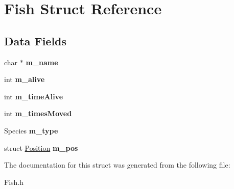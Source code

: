 \hypertarget{structFish}{\section{\-Fish \-Struct \-Reference}
\label{structFish}
}
\subsection*{\-Data \-Fields}
\begin{DoxyCompactItemize}
\item 
\hypertarget{structFish_a227fc9c6e076c3a45c48529133c4449b}{char $\ast$ {\bfseries m\-\_\-name}}\label{structFish_a227fc9c6e076c3a45c48529133c4449b}

\item 
\hypertarget{structFish_a9b5f5cc3303bdebc23cd2a22be494b9b}{int {\bfseries m\-\_\-alive}}\label{structFish_a9b5f5cc3303bdebc23cd2a22be494b9b}

\item 
\hypertarget{structFish_a3581ebfb141a0b221655da596359917c}{int {\bfseries m\-\_\-time\-Alive}}\label{structFish_a3581ebfb141a0b221655da596359917c}

\item 
\hypertarget{structFish_a8e361a8153eec3d33df2c6d3d556ee91}{int {\bfseries m\-\_\-times\-Moved}}\label{structFish_a8e361a8153eec3d33df2c6d3d556ee91}

\item 
\hypertarget{structFish_aa1bf10688c35a647e76457fbc0b01eab}{\-Species {\bfseries m\-\_\-type}}\label{structFish_aa1bf10688c35a647e76457fbc0b01eab}

\item 
\hypertarget{structFish_adf81a49526a2eab82ba2db065c0f5b88}{struct \hyperlink{structPosition}{\-Position} {\bfseries m\-\_\-pos}}\label{structFish_adf81a49526a2eab82ba2db065c0f5b88}

\end{DoxyCompactItemize}


\-The documentation for this struct was generated from the following file\-:\begin{DoxyCompactItemize}
\item 
\-Fish.\-h\end{DoxyCompactItemize}
